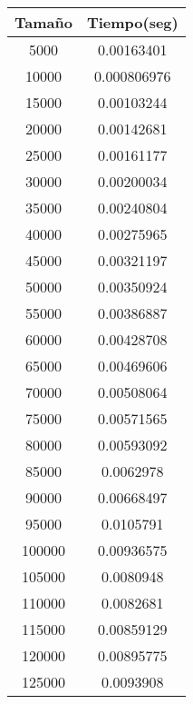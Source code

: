 \begin{longtable}{|c|c|}
\hline
\textbf{Tamaño} & \textbf{Tiempo(seg)} \\ \hline
5000   & 0.00163401     \\ \hline
10000  & 0.000806976    \\ \hline
15000  & 0.00103244     \\ \hline
20000  & 0.00142681     \\ \hline
25000  & 0.00161177     \\ \hline
30000  & 0.00200034     \\ \hline
35000  & 0.00240804     \\ \hline
40000  & 0.00275965     \\ \hline
45000  & 0.00321197     \\ \hline
50000  & 0.00350924     \\ \hline
55000  & 0.00386887     \\ \hline
60000  & 0.00428708     \\ \hline
65000  & 0.00469606     \\ \hline
70000  & 0.00508064     \\ \hline
75000  & 0.00571565     \\ \hline
80000  & 0.00593092     \\ \hline
85000  & 0.0062978      \\ \hline
90000  & 0.00668497     \\ \hline
95000  & 0.0105791      \\ \hline
100000 & 0.00936575     \\ \hline
105000 & 0.0080948      \\ \hline
110000 & 0.0082681      \\ \hline
115000 & 0.00859129     \\ \hline
120000 & 0.00895775     \\ \hline
125000 & 0.0093908      \\ \hline
\end{longtable}
